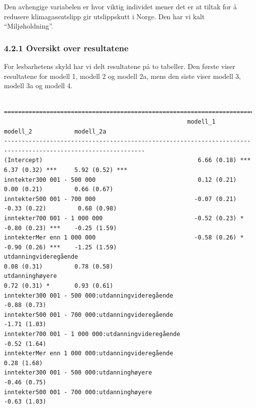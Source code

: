 \documentclass[
  12pt,
  letterpaper,
  DIV=11,
  numbers=noendperiod]{scrartcl}
\begin{document}
Den avhengige variabelen er hvor viktig individet mener det er at tiltak
for å redusere klimagassutslipp gir utslippskutt i Norge. Den har vi
kalt ``Miljøholdning''.

\hypertarget{oversikt-over-resultatene}{%
\subsubsection{4.2.1 Oversikt over
resultatene}\label{oversikt-over-resultatene}}

For lesbarhetens skyld har vi delt resultatene på to tabeller. Den
første viser resultatene for modell 1, modell 2 og modell 2a, mens den
siste viser modell 3, modell 3a og modell 4.

\begin{verbatim}

==============================================================================================================
                                                    modell_1            modell_2            modell_2a         
--------------------------------------------------------------------------------------------------------------
(Intercept)                                            6.66 (0.18) ***     6.37 (0.32) ***     5.92 (0.52) ***
inntekter300 001 - 500 000                             0.12 (0.21)         0.00 (0.21)         0.66 (0.67)    
inntekter500 001 - 700 000                            -0.07 (0.21)        -0.33 (0.22)         0.68 (0.98)    
inntekter700 001 - 1 000 000                          -0.52 (0.23) *      -0.80 (0.23) ***    -0.25 (1.59)    
inntekterMer enn 1 000 000                            -0.58 (0.26) *      -0.90 (0.26) ***    -1.25 (1.59)    
utdanningvideregående                                                      0.08 (0.31)         0.78 (0.58)    
utdanninghøyere                                                            0.72 (0.31) *       0.93 (0.61)    
inntekter300 001 - 500 000:utdanningvideregående                                              -0.88 (0.73)    
inntekter500 001 - 700 000:utdanningvideregående                                              -1.71 (1.03)    
inntekter700 001 - 1 000 000:utdanningvideregående                                            -0.52 (1.64)    
inntekterMer enn 1 000 000:utdanningvideregående                                               0.28 (1.68)    
inntekter300 001 - 500 000:utdanninghøyere                                                    -0.46 (0.75)    
inntekter500 001 - 700 000:utdanninghøyere                                                    -0.63 (1.03)    

\end{verbatim}
\end{document}

